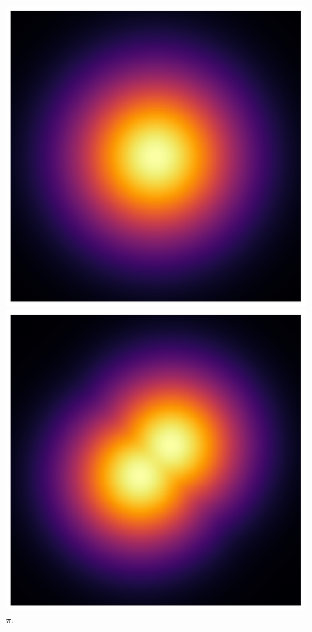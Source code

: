 \begin{figure}[t]
    \centering
    \begin{minipage}{0.15\textwidth}
      \centering
      \includegraphics[width=\textwidth]{../img/heatmap_path_1.pdf}
      \caption*{$\pi_1$}
    \end{minipage}
    \begin{minipage}{0.15\textwidth}
      \centering
      \includegraphics[width=\textwidth]{../img/heatmap_path_2.pdf}

\end{minipage}
\end{figure}
